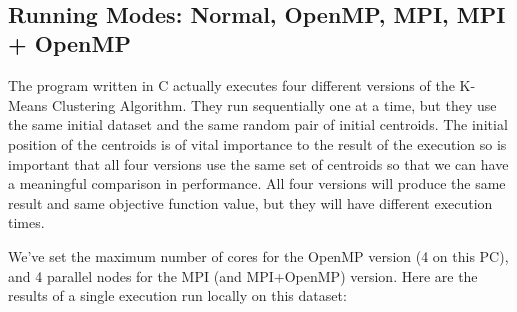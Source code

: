 \documentclass[11pt]{article}
\begin{document}
    \begin{center}
    \end{center}
    { \hspace*{\fill} \\}
    
    \hypertarget{running-modes-normal-openmp-mpi-mpi-openmp}{%
\subsection{Running Modes: Normal, OpenMP, MPI, MPI +
OpenMP}\label{running-modes-normal-openmp-mpi-mpi-openmp}}

    The program written in C actually executes four different versions of
the K-Means Clustering Algorithm. They run sequentially one at a time,
but they use the same initial dataset and the same random pair of
initial centroids. The initial position of the centroids is of vital
importance to the result of the execution so is important that all four
versions use the same set of centroids so that we can have a meaningful
comparison in performance. All four versions will produce the same
result and same objective function value, but they will have different
execution times.

We've set the maximum number of cores for the OpenMP version (4 on this
PC), and 4 parallel nodes for the MPI (and MPI+OpenMP) version. Here are
the results of a single execution run locally on this dataset:
\end{document}
